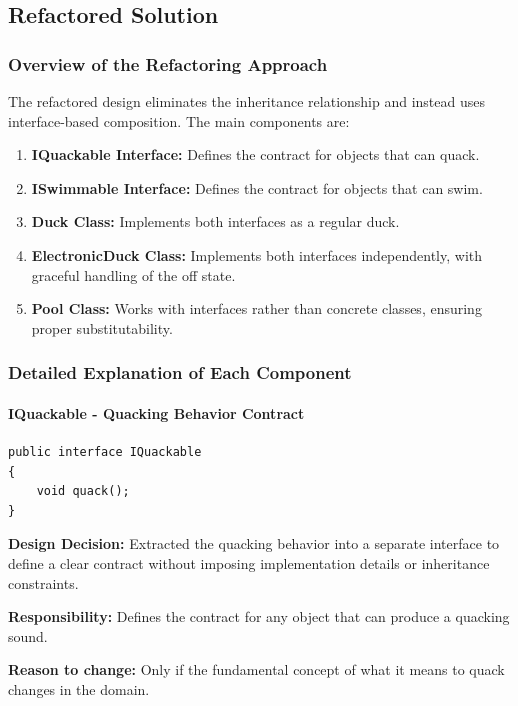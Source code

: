 \subsection{Refactored Solution}

\subsubsection{Overview of the Refactoring Approach}

The refactored design eliminates the inheritance relationship and instead uses interface-based composition. The main components are:

\begin{enumerate}
    \item \textbf{IQuackable Interface:} Defines the contract for objects that can quack.
    \item \textbf{ISwimmable Interface:} Defines the contract for objects that can swim.
    \item \textbf{Duck Class:} Implements both interfaces as a regular duck.
    \item \textbf{ElectronicDuck Class:} Implements both interfaces independently, with graceful handling of the off state.
    \item \textbf{Pool Class:} Works with interfaces rather than concrete classes, ensuring proper substitutability.
\end{enumerate}

\subsubsection{Detailed Explanation of Each Component}

\paragraph{IQuackable - Quacking Behavior Contract}

\begin{verbatim}
public interface IQuackable
{
    void quack();
}
\end{verbatim}

\textbf{Design Decision:} Extracted the quacking behavior into a separate interface to define a clear contract without imposing implementation details or inheritance constraints.

\textbf{Responsibility:} Defines the contract for any object that can produce a quacking sound.

\textbf{Reason to change:} Only if the fundamental concept of what it means to quack changes in the domain.

